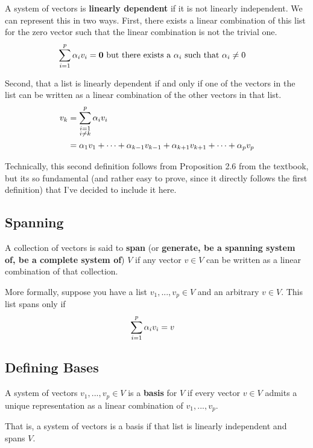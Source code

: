 \begin{definition}
    A system of vectors is \textbf{linearly dependent} if it is not linearly independent. We can represent this in two ways. First, there exists a 
    linear combination of this list for the zero vector such that the linear combination is not the trivial one.
    \begin{align*}
        \sum_{i = 1}^{p} \alpha_i v_i &= \mathbf{0} \text{ but there exists a $\alpha_i$ such that $\alpha_i \neq 0$}
    \end{align*}

    Second, that a list is linearly dependent if and only if one of the vectors in the list can be written as a linear combination of the other 
    vectors in that list.
    \begin{align*}
        v_k &= \sum_{\substack{i = 1 \\ i \neq k}}^{p} \alpha_i v_i \\
        &= \alpha_1 v_1 + \cdots + \alpha_{k - 1} v_{k - 1} + \alpha_{k + 1} v_{k + 1} + \cdots + \alpha_p v_p
    \end{align*}

    Technically, this second definition follows from Proposition 2.6 from the textbook, but its so fundamental (and rather easy to prove, since
    it directly follows the first definition) that I've decided to include it here.
\end{definition}

\subsection{Spanning}
\begin{definition}
    A collection of vectors is said to \textbf{span} (or \textbf{generate, be a spanning system of, be a complete system of}) $V$ if any vector
    $v \in V$ can be written as a linear combination of that collection.

    More formally, suppose you have a list $v_1, ..., v_p \in V$ and an arbitrary $v \in V$. This list spans only if
    \begin{align*}
        \sum_{i = 1}^{p} \alpha_i v_i &= v
    \end{align*}
\end{definition}

\subsection{Defining Bases}
\begin{definition}
    A system of vectors $v_1, ..., v_p \in V$ is a \textbf{basis} for $V$ if every vector $v \in V$ admits a unique representation as a linear 
    combination of $v_1, ..., v_p$. 
    
    That is, a system of vectors is a basis if that list is linearly independent and spans $V$.
\end{definition}

